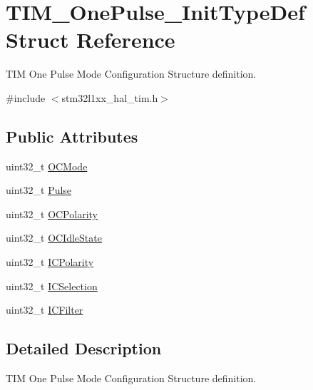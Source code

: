 \hypertarget{struct_t_i_m___one_pulse___init_type_def}{\section{T\-I\-M\-\_\-\-One\-Pulse\-\_\-\-Init\-Type\-Def Struct Reference}
\label{struct_t_i_m___one_pulse___init_type_def}
}


T\-I\-M One Pulse Mode Configuration Structure definition.  




{\ttfamily \#include $<$stm32l1xx\-\_\-hal\-\_\-tim.\-h$>$}

\subsection*{Public Attributes}
\begin{DoxyCompactItemize}
\item 
uint32\-\_\-t \hyperlink{struct_t_i_m___one_pulse___init_type_def_af127f01162853e39ae616b43cc52b674}{O\-C\-Mode}
\item 
uint32\-\_\-t \hyperlink{struct_t_i_m___one_pulse___init_type_def_a4f1fbf6d60812c3194e9ee8a05f5cfa6}{Pulse}
\item 
uint32\-\_\-t \hyperlink{struct_t_i_m___one_pulse___init_type_def_a3028787ad41698072cbf70ddf1b6c984}{O\-C\-Polarity}
\item 
uint32\-\_\-t \hyperlink{struct_t_i_m___one_pulse___init_type_def_aef11bcea1dbf3e3ddf2a4bbc2846bb1e}{O\-C\-Idle\-State}
\item 
uint32\-\_\-t \hyperlink{struct_t_i_m___one_pulse___init_type_def_a8589cf95218ea62604b845054b36b772}{I\-C\-Polarity}
\item 
uint32\-\_\-t \hyperlink{struct_t_i_m___one_pulse___init_type_def_a9e8853f17e85393a869aa2ecb315f030}{I\-C\-Selection}
\item 
uint32\-\_\-t \hyperlink{struct_t_i_m___one_pulse___init_type_def_a883e69dec14d8bde9914906be1b04ad7}{I\-C\-Filter}
\end{DoxyCompactItemize}


\subsection{Detailed Description}
T\-I\-M One Pulse Mode Configuration Structure definition. 

